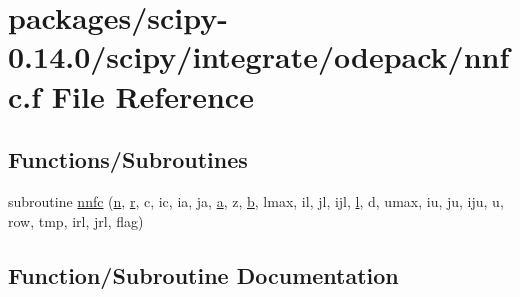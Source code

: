 \hypertarget{nnfc_8f}{}\section{packages/scipy-\/0.14.0/scipy/integrate/odepack/nnfc.f File Reference}
\label{nnfc_8f}
\subsection*{Functions/\+Subroutines}
\begin{DoxyCompactItemize}
\item 
subroutine \hyperlink{nnfc_8f_a2d9170e2b43f9614ec10e9c2b94d48a1}{nnfc} (\hyperlink{indexexpr_8h_ab427e2e2b4d6cec55fa088ea2a692ace}{n}, \hyperlink{indexexpr_8h_ac434fd11cc2493608d8d91424d60c17e}{r}, c, ic, ia, ja, \hyperlink{gen__mat5files_8m_aae328bf20413f220e38aec4d95bfd6da}{a}, z, \hyperlink{gen__mat5files_8m_a7b38767b3b6a8dae167e5afa4fc340b0}{b}, lmax, il, jl, ijl, \hyperlink{indexexpr_8h_a88aacdaa46b76729743ee33ef8b95a58}{l}, d, umax, iu, ju, iju, u, row, tmp, irl, jrl, flag)
\end{DoxyCompactItemize}


\subsection{Function/\+Subroutine Documentation}
\hypertarget{nnfc_8f_a2d9170e2b43f9614ec10e9c2b94d48a1}{}
